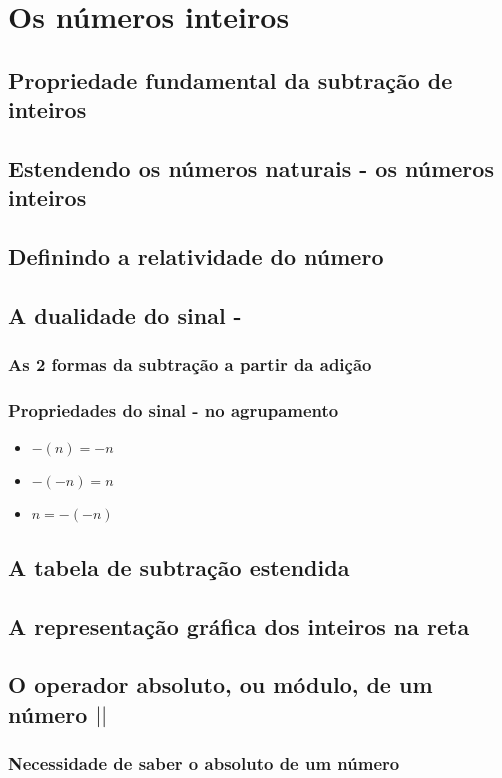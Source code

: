 \chapter[Os números inteiros]{Os números inteiros}

\section{Propriedade fundamental da subtração de inteiros}

\section{Estendendo os números naturais - os números inteiros}

\section{Definindo a relatividade do número}

\section{A dualidade do sinal -}

\subsection{As 2 formas da subtração a partir da adição}

\subsection{Propriedades do sinal - no agrupamento}

\begin{itemize}[leftmargin=3cm]
	\item $ -(n) = -n  $ 
	\item $ -(-n) = n  $
	\item $ n = -(-n) $
\end{itemize}

\section{A tabela de subtração estendida}

\section{A representação gráfica dos inteiros na reta}

\section{O operador absoluto, ou módulo, de um número $ | | $}

\subsection{Necessidade de saber o absoluto de um número}